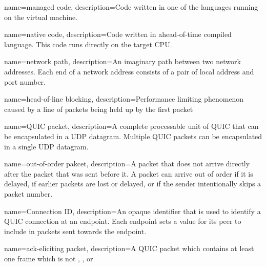 \makeglossaries

{
  name=managed code,
  description={Code written in one of the \dotnet{} languages running on the \dotnet{} virtual machine.}
}

{
  name=native code,
  description={Code written in ahead-of-time compiled language. This code runs directly on the target CPU.}
}

{
    name=network path,
    description={An imaginary path between two network addresses. Each end of a network address consists of a pair of local address and port number.}
}

{
    name=head-of-line blocking,
    description={Performance limiting phenomenon caused by a line of packets being held up by the first packet}
}

{
    name=QUIC packet,
    description={A complete processable unit of QUIC that can be
  encapsulated in a UDP datagram.  Multiple QUIC packets can be
  encapsulated in a single UDP datagram.}
}

{
  name=out-of-order pakcet,
  description={A packet that does not arrive directly after the packet that was
  sent before it.  A packet can arrive out of order if it is delayed, if earlier packets are
  lost or delayed, or if the sender intentionally skips a packet number.}
}

{
  name=Connection ID,
  description={An opaque identifier that is used to identify a QUIC
  connection at an endpoint.  Each endpoint sets a value for its
  peer to include in packets sent towards the endpoint.}
}

{
  name=ack-eliciting packet,
  description={A QUIC packet which contains at least one frame which is not \PADDING{},  \ACK{}, or \CONNECTIONCLOSE{}}
}

